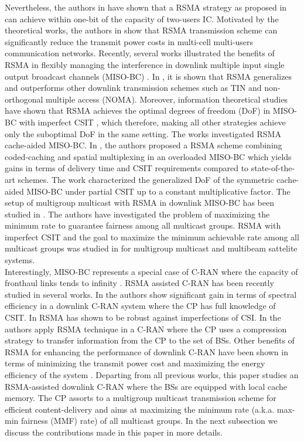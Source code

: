 \documentclass[12pt,draftcls,onecolumn]{IEEEtran}
\theoremstyle{remark}
\theoremstyle{definition}
\begin{document}
Nevertheless, the authors in \cite{4675741} have shown that a RSMA strategy as proposed in \cite{Carleial78, 1056307} can achieve within one-bit of the capacity of two-users IC. Motivated by the theoretical works, the authors in \cite{5910112} show that RSMA transmission scheme can significantly reduce the transmit power costs in multi-cell multi-users communication networks. Recently, several works illustrated the benefits of RSMA in flexibly managing the interference in downlink multiple input single output broadcast channels (MISO-BC) \cite{7513415,7434643,7555358,7867076,8907421,7470942, Mao4 ,Mao,9120024,7972900,mao2019dirty}. In \cite{Mao}, it is shown that RSMA generalizes and outperforms other downlink transmission schemes such as TIN and non-orthogonal multiple access (NOMA). Moreover, information theoretical studies have shown that RSMA achieves the optimal degrees of freedom (DoF) in MISO-BC with imperfect CSIT \cite{7555358, 7972900, mao2019dirty}, which therefore, making all other strategies achieve only the suboptimal DoF in the same setting. The works \cite{8007039,8703386} investigated RSMA cache-aided MISO-BC. In \cite{8007039}, the authors proposed a RSMA scheme combining coded-caching and spatial multiplexing in an overloaded MISO-BC which yields gains in terms of delivery time and CSIT requirements compared to state-of-the-art schemes. The work \cite{8703386} characterized the generalized DoF of the symmetric cache-aided MISO-BC under partial CSIT up to a constant multiplicative factor. The setup of multigroup multicast with RSMA in downlink MISO-BC has been studied in \cite{8019852,8445878}. The authors have investigated the problem of maximizing the minimum rate to guarantee fairness among all multicast groups. RSMA with imperfect CSIT and the goal to maximize the minimum achievable rate among all multicast groups was studied in \cite{9257433} for multigroup multicast and multibeam sattelite systems. \\ 
\indent Interestingly, MISO-BC represents a special case of C-RAN where the capacity of fronthaul links tends to infinity \cite{97813165296}. RSMA assisted C-RAN has been recently studied in several works. In \cite{8732995} the authors show significant gain in terms of spectral efficiency in a downlink C-RAN system where the CP has full knowledge of CSIT. In \cite{ahmad2020rate} RSMA has shown to be robust against imperfections of CSI. In \cite{8756076} the authors apply RSMA technique in a C-RAN where the CP uses a compression strategy to transfer information from the CP to the set of BSs. Other benefits of RSMA for enhancing the performance of downlink C-RAN have been shown in terms of minimizing the transmit power cost \cite{9145363} and maximizing the energy efficiency of the system \cite{9145076}. 
Departing from all previous works, this paper studies an RSMA-assisted downlink C-RAN where the BSs are equipped with local cache memory. The CP assorts to a multigroup multicast transmission scheme for efficient content-delivery and aims at maximizing the minimum rate (a.k.a. max-min fairness (MMF) rate) of all multicast groups. In the next subsection we discuss the contributions made in this paper in more details.
\end{document}
